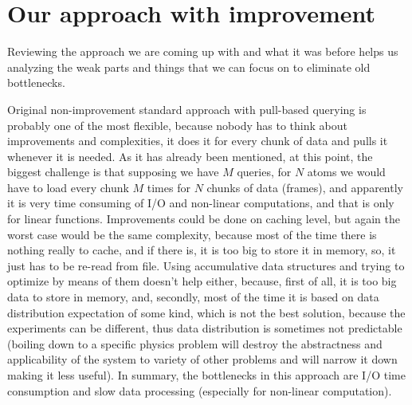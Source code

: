 \documentclass[12pt,letterpaper]{report}
\begin{document}
\section{Our approach with improvement}

\hspace{3em} Reviewing the approach we are coming up with and what it was before helps us analyzing the weak parts and things that we can focus on to eliminate old bottlenecks.

Original non-improvement standard approach with pull-based querying is probably one of the most flexible, because nobody has to think about improvements and complexities, it does it for every chunk of data and pulls it whenever it is needed. As it has already been mentioned, at this point, the biggest challenge is that supposing we have $M$ queries, for $N$ atoms we would have to load every chunk $M$ times for $N$ chunks of data (frames), and apparently it is very time consuming of I/O and non-linear computations, and that is only for linear functions. Improvements could be done on caching level, but again the worst case would be the same complexity, because most of the time there is nothing really to cache, and if there is, it is too big to store it in memory, so, it just has to be re-read from file. Using accumulative data structures and trying to optimize by means of them doesn't help either, because, first of all, it is too big data to store in memory, and, secondly, most of the time it is based on data distribution expectation of some kind, which is not the best solution, because the experiments can be different, thus data distribution is sometimes not predictable (boiling down to a specific physics problem will destroy the abstractness and applicability of the system to variety of other problems and will narrow it down making it less useful). In summary, the bottlenecks in this approach are I/O time consumption and slow data processing (especially for non-linear computation).
\end{document}
